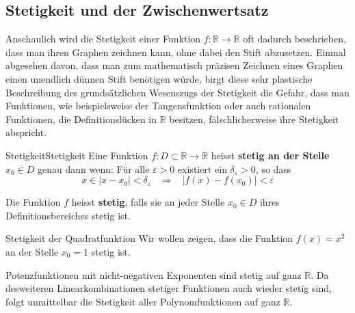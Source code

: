 \subsection{Stetigkeit und der Zwischenwertsatz}
Anschaulich wird die Stetigkeit einer Funktion $f:\mathbb{R} \longrightarrow \mathbb{R}$ oft dadurch beschrieben, dass man ihren Graphen zeichnen kann, ohne dabei den Stift abzusetzen. Einmal abgesehen davon, dass man zum mathematisch präzisen Zeichnen eines Graphen einen unendlich dünnen Stift benötigen würde, birgt diese sehr plastische Beschreibung des grundsätzlichen Wesenszugs der Stetigkeit die Gefahr, dass man Funktionen, wie beispielsweise der Tangensfunktion oder auch rationalen Funktionen, die Definitionslücken in $\mathbb{R}$ besitzen, fälschlicherweise ihre Stetigkeit abspricht.


\begin{definition}{Stetigkeit}{Stetigkeit}
    Eine Funktion $f:D\subset \mathbb{R} \longrightarrow \mathbb{R}$ heisst \textbf{stetig an der Stelle $x_0\in D$} genau dann wenn:\newline
    Für alle   $\varepsilon > 0$  existiert ein $\delta_\varepsilon >0$, so dass $$x\in |x-x_0|<\delta_\varepsilon \;\;\; \Longrightarrow \;\;\; |f(x)-f(x_0)|<\varepsilon$$

Die Funktion $f$ heisst \textbf{stetig}, falls sie an jeder Stelle $x_0\in D$ ihres Definitionsbereiches stetig ist.
\end{definition}

\begin{bsp}{Stetigkeit der Quadratfunktion}{}
    Wir wollen zeigen, dass die Funktion $f(x)=x^2$ an der Stelle $x_0=1$ stetig ist.
    \vspace{10cm}
\end{bsp}
\clearpage



Potenzfunktionen mit nicht-negativen Exponenten sind stetig auf ganz $\mathbb{R}$. Da desweiteren Linearkombinationen stetiger Funktionen auch wieder stetig sind, folgt unmittelbar die Stetigkeit aller Polynomfunktionen auf ganz $\mathbb{R}$.

\begin{center}
\end{center}

